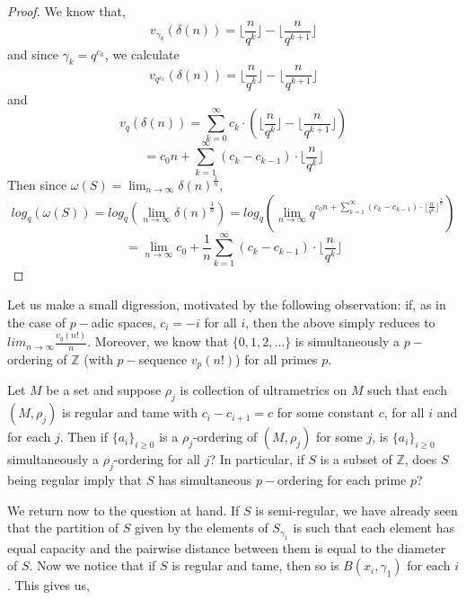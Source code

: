 \begin{proof}
	We know that,
\[v_{\gamma_k}(\delta(n)) =  \lfloor\frac{n}{q^k}\rfloor - \lfloor\frac{n}{q^{k+1}}\rfloor \]
and since $\gamma_k = q^{c_k}$, we calculate
\[v_{q^{c_k}}(\delta(n)) =  \lfloor\frac{n}{q^k}\rfloor - \lfloor\frac{n}{q^{k+1}}\rfloor \]
and
\[v_{q}(\delta(n)) =  \sum_{k=0}^{\infty} c_k \cdot(\lfloor\frac{n}{q^k}\rfloor - \lfloor\frac{n}{q^{k+1}}\rfloor) \]
\[=  c_0n + \sum_{k=1}^{\infty} (c_{k} - c_{k-1}) \cdot \lfloor\frac{n}{q^{k}}\rfloor \]
Then since $\omega(S) = \lim_{n\to\infty} \delta(n) ^{\frac{1}{n}}$,
\[log_q(\omega(S)) = log_q(\lim_{n\to\infty} \delta(n) ^{\frac{1}{n}}) = log_q(\lim_{n\to\infty}q^{{c_0n + \sum_{k=1}^{\infty} (c_{k} - c_{k-1}) \cdot \lfloor\frac{n}{q^{k}}\rfloor}^{\frac{1}{n}}})\]
 \[=\lim_{n\to\infty} c_0 + \frac{1}{n}\sum_{k=1}^{\infty} (c_{k} - c_{k-1}) \cdot \lfloor\frac{n}{q^{k}}\rfloor \] 
\end{proof}

Let us make a small digression, motivated by the following observation: if, as in the case of $p-$adic spaces, $c_i=-i$ for all $i$, then the above simply reduces to $lim_{n\to\infty} \frac{v_q(n!)}{n} $. Moreover, we know that $\{0,1,2,\ldots\}$ is simultaneously a $p-$ordering of $\mathbb{Z}$ (with $p-$sequence $v_p(n!)$) for all primes $p$. 

\begin{question}
	Let $M$ be a set and suppose $\rho_j$ is collection of ultrametrics on $M$ such that each $(M,\rho_j)$ is regular and tame with $c_i-c_{i+1}=c$ for some constant $c$, for all $i$ and for each $j$. Then if $\{a_i\}_{i \geq 0 }$ is a $\rho_j$-ordering of $(M,\rho_j)$ for some $j$, is $\{a_i\}_{i \geq 0 }$ simultaneously a $\rho_j$-ordering for all $j$? In particular, if $S$ is a subset of $\mathbb{Z}$, does $S$ being regular imply that $S$ has simultaneous $p-$ordering for each prime $p$?
\end{question}

We return now to the question at hand. If $S$ is semi-regular, we have already seen that the partition of $S$ given by the elements of $S_{\gamma_1}$ is such that each element has equal capacity and the pairwise distance between them is equal to the diameter of $S$. Now we notice that if $S$ is regular and tame, then so is $B(x_i,\gamma_1)$ for each $i$. This gives us, 

